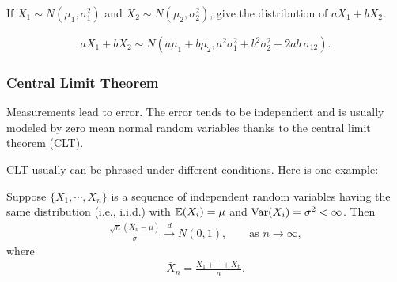 \begin{frame}[fragile,t]
\begin{myexample}
	If $X_1\sim N(\mu_1,\sigma_1^2)$ and $X_2\sim N(\mu_2,\sigma_2^2)$, give the distribution of $a X_1
	+ b X_2$.
\end{myexample}
\bigskip
\pause
\begin{mysol}
	\begin{align*}
		a X_1 + b X_2 \sim N\left(a \mu_1+b\mu_2,a^2 \sigma_1^2+b^2 \sigma_2^2 + 2ab\: \sigma_{12}\right).
	\end{align*}
	\myEnd
\end{mysol}
\end{frame}
\begin{frame}[fragile,t]
	\frametitle{Central Limit Theorem}

	Measurements lead to error. The error tends to be independent and is usually modeled by zero mean
	normal random variables thanks to the central limit theorem (CLT).  \bigskip \pause

	CLT usually can be phrased under different conditions. Here is one example: \pause

	\begin{mythm}
		Suppose $ \{X_1,\cdots, X_n\} $ is a sequence of independent random variables having the same
		distribution (i.e., i.i.d.) with $\mathbb{E}(X_i)=\mu$ and  $\text{Var}(X_i)=\sigma^2<\infty$. Then
	  \begin{align*}
		  \frac{\sqrt{n}(\overline{X}_n-\mu)}{\sigma} \stackrel{d}{\to} N(0,1), \qquad \text{as $n\to\infty$},
		\end{align*}
		where
		\begin{align*}
			\overline{X}_n = \frac{X_1+\cdots + X_n}{n}.
		\end{align*}
\end{mythm}
\end{frame}
